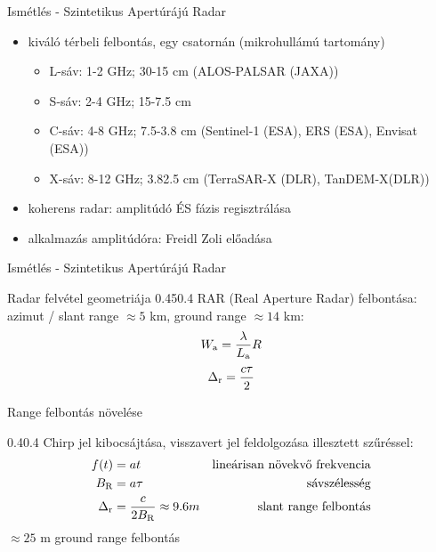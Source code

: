 \def\ft{Ismétlés - Szintetikus Apertúrájú Radar}

\begin{frame}{\ft}
    \begin{itemize}
        \item kiváló térbeli felbontás, egy csatornán (mikrohullámú tartomány)
        \begin{itemize}
            \item L-sáv: 1-2 GHz; 30-15 cm (ALOS-PALSAR (JAXA))
            \item S-sáv: 2-4 GHz; 15-7.5 cm
            \item C-sáv: 4-8 GHz; 7.5-3.8 cm (Sentinel-1 (ESA), ERS (ESA), Envisat (ESA))
            \item X-sáv: 8-12 GHz; 3.82.5 cm (TerraSAR-X (DLR), TanDEM-X(DLR))
        \end{itemize}
        \item koherens radar: amplitúdó ÉS fázis regisztrálása
        \item alkalmazás amplitúdóra: Freidl Zoli előadása
    \end{itemize}
\end{frame}


\begin{frame}{\ft}
    \begin{figp}{}{Radar felvétel geometriája \cite{RamonHanssen}}{0.45}{0.4}
        RAR (Real Aperture Radar) felbontása: azimut / slant range $\approx 5$ km, ground range $\approx 14$ km:
        $$ W_{\text{a}} = \frac{\lambda}{L_{\text{a}}} R $$
        $$ \Delta_{\text{r}} = \frac{c\tau}{2} $$
    \end{figp}
\end{frame}

\def\ft{Range felbontás növelése}

\begin{frame}{\ft}
    \begin{figp}{}{}{0.4}{0.4}
        Chirp jel kibocsájtása, visszavert jel feldolgozása illesztett szűréssel:
        \begin{align*}
            f(t) &= a t & \text{lineárisan növekvő frekvencia} \\
            B_{\text{R}} &= a \tau & \text{sávszélesség} \\
            \Delta_{\text{r}} &= \frac{c}{2 B_{\text{R}}} \approx 9.6 m & \text{slant range felbontás}
        \end{align*}
        $\approx 25$ m ground range felbontás
    \end{figp}
\end{frame}

